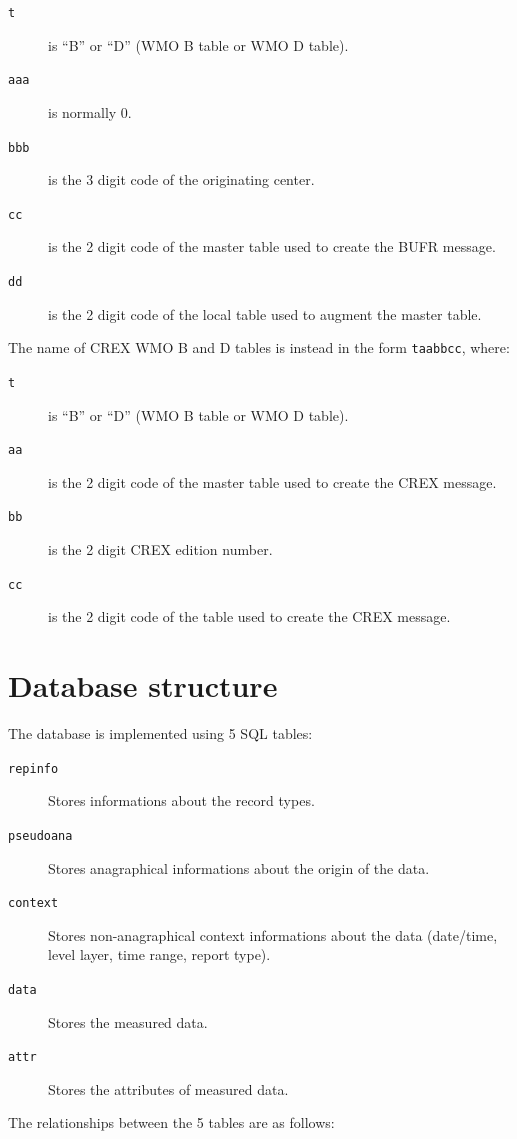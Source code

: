 \begin{description}
\item[{\tt t}] is ``B'' or ``D'' (WMO B table or WMO D table).
\item[{\tt aaa}] is normally 0.
\item[{\tt bbb}] is the 3 digit code of the originating center.
\item[{\tt cc}] is the 2 digit code of the master table used to create the BUFR
                message.
\item[{\tt dd}] is the 2 digit code of the local table used to augment the
                master table.
\end{description}

The name of CREX WMO B and D tables is instead in the form {\tt taabbcc}, where:

\begin{description}
\item[{\tt t}] is ``B'' or ``D'' (WMO B table or WMO D table).
\item[{\tt aa}] is the 2 digit code of the master table used to create the CREX
                message.
\item[{\tt bb}] is the 2 digit CREX edition number.
\item[{\tt cc}] is the 2 digit code of the table used to create the CREX
                message.
\end{description}


\section{Database structure}

The \dballe{} database is implemented using 5 SQL tables:

\begin{description}
\item[{\tt repinfo}]
  Stores informations about the record types.
\item[{\tt pseudoana}]
  Stores anagraphical informations about the origin of the data.
\item[{\tt context}]
  Stores non-anagraphical context informations about the data (date/time, level
  layer, time range, report type).
\item[{\tt data}]
  Stores the measured data.
\item[{\tt attr}]
  Stores the attributes of measured data.
\end{description}

The relationships between the 5 tables are as follows:

